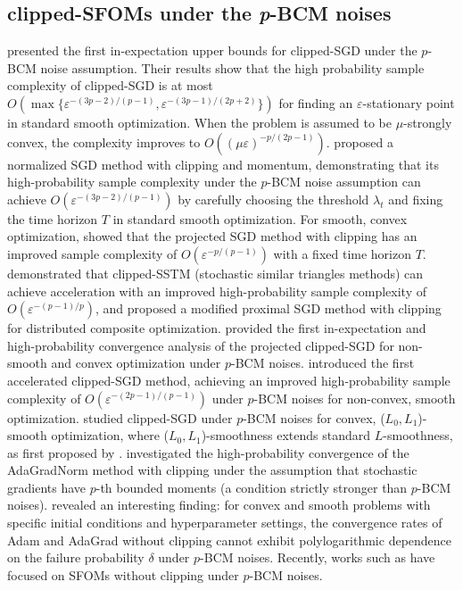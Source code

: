 \documentclass{article}
\begin{document}
\subsection{clipped-SFOMs under the \textit{p}-BCM noises}
\cite{zhang_2020} presented the first in-expectation upper bounds for clipped-SGD under the $p$-BCM noise assumption. Their results show that the high probability sample complexity of clipped-SGD is at most $O\left(\max\{\varepsilon^{-(3p-2)/(p-1)},\varepsilon^{-(3p-1)/(2p+2)}\}\right)$ for finding an $\varepsilon$-stationary point in standard smooth optimization. When the problem is assumed to be $\mu$-strongly convex, the complexity improves to $O((\mu\varepsilon)^{-p/(2p-1)})$. \cite{Cutkosky_2021} proposed a normalized SGD method with clipping and momentum, demonstrating  that its high-probability sample complexity under the $p$-BCM noise assumption can achieve $O(\varepsilon^{-(3p-2)/(p-1)})$ by carefully choosing the threshold $\lambda_t$ and fixing the time horizon $T$ in standard smooth optimization. For smooth, convex optimization, \cite{Nguyen_2023} showed that the projected SGD method with clipping has an improved sample complexity of $O(\varepsilon^{-p/(p-1)})$ with a fixed time horizon $T$. \cite{sadiev2023highprobabilityboundsstochasticoptimization} demonstrated that clipped-SSTM (stochastic similar triangles methods) can achieve acceleration with an improved high-probability sample complexity of $O(\varepsilon^{-(p-1)/p})$, and \cite{gorbunov2024highprobabilityconvergencecompositedistributed} proposed a modified proximal SGD method with clipping for distributed composite optimization. \cite{liu_2023stochasticnonsmoothconvexoptimization} provided the first in-expectation and high-probability convergence analysis of the projected clipped-SGD for non-smooth and convex optimization under $p$-BCM noises. \citep{liu_2023c} introduced the first accelerated clipped-SGD method, achieving an improved high-probability sample complexity of $O(\varepsilon^{-(2p-1)/(p-1)})$ under $p$-BCM noises for non-convex, smooth optimization. \cite{chezhegov2025convergenceclippedsgdconvexl0l1smooth} studied clipped-SGD under $p$-BCM noises for convex, ($L_0,L_1$)-smooth optimization, where ($L_0,L_1$)-smoothness extends standard $L$-smoothness, as first proposed by \cite{zhang2020gradientclippingacceleratestraining}. \cite{li2023highprobabilityanalysisnonconvex} investigated the high-probability convergence of the AdaGradNorm method with clipping under the assumption that stochastic gradients have $p$-th bounded moments (a condition strictly stronger than $p$-BCM noises). \cite{chezhegov2025clippingimprovesadamnormadagradnorm} revealed an interesting finding: for convex and smooth problems with specific initial conditions and hyperparameter settings, the convergence rates of Adam and AdaGrad without clipping cannot exhibit polylogarithmic dependence on the failure probability $\delta$ under $p$-BCM noises.  Recently, works such as \citep{liu_2025nonconvexstochasticoptimizationheavytailed, hubler_2025gradientclippingnormalizationheavy, kornilov2025signoperatorcopingheavytailed, he2025complexitynormalizedstochasticfirstorder} have focused on SFOMs without clipping under $p$-BCM noises. 
\end{document}
